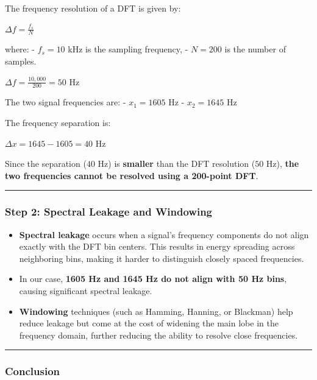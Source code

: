 \documentclass[11pt]{article}
\providecommand{\tightlist}{%
      \setlength{\itemsep}{0pt}\setlength{\parskip}{0pt}}
\begin{document}
The frequency resolution of a DFT is given by:

\(\Delta f = \frac{f_s}{N}\)

where: - \(f_s = 10\) kHz is the sampling frequency, - \(N = 200\) is
the number of samples.

\(\Delta f = \frac{10,000}{200} = 50 \text{ Hz}\)

The two signal frequencies are: - \(x_1 = 1605\) Hz - \(x_2 = 1645\) Hz

The frequency separation is:

\(\Delta x = 1645 - 1605 = 40 \text{ Hz}\)

Since the separation (\(40\) Hz) is \textbf{smaller} than the DFT
resolution (\(50\) Hz), \textbf{the two frequencies cannot be resolved
using a 200-point DFT}.

\begin{center}\rule{0.5\linewidth}{0.5pt}\end{center}

\subsubsection{\texorpdfstring{\textbf{Step 2: Spectral Leakage and
Windowing}}{Step 2: Spectral Leakage and Windowing}}\label{step-2-spectral-leakage-and-windowing}

\begin{itemize}
\tightlist
\item
  \textbf{Spectral leakage} occurs when a signal's frequency components
  do not align exactly with the DFT bin centers. This results in energy
  spreading across neighboring bins, making it harder to distinguish
  closely spaced frequencies.
\item
  In our case, \textbf{1605 Hz and 1645 Hz do not align with 50 Hz
  bins}, causing significant spectral leakage.
\item
  \textbf{Windowing} techniques (such as Hamming, Hanning, or Blackman)
  help reduce leakage but come at the cost of widening the main lobe in
  the frequency domain, further reducing the ability to resolve close
  frequencies.
\end{itemize}

\begin{center}\rule{0.5\linewidth}{0.5pt}\end{center}

\subsubsection{\texorpdfstring{\textbf{Conclusion}}{Conclusion}}\label{conclusion}
\end{document}
